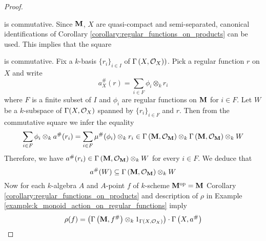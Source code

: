 \begin{proof}
\begin{center}
\begin{tikzpicture}
\end{tikzpicture}
\end{center}
is commutative. Since $\bd{M}$, $X$ are quasi-compact and semi-separated, canonical identifications of Corollary \ref{corollary:regular_functions_on_products} can be used. This implies that the square
\begin{center}
\end{center}
is commutative. Fix a $k$-basis $\{r_i\}_{i\in I}$ of $\Gamma\left(X,\cO_X)\right)$. Pick a regular function $r$ on $X$ and write
$$a^{\#}_X(r) = \sum_{i\in F}\phi_i\otimes_kr_i$$
where $F$ is a finite subset of $I$ and $\phi_i$ are regular functions on $\bd{M}$ for $i\in F$. Let $W$ be a $k$-subspace of $\Gamma(X,\cO_X)$ spanned by $\{r_i\}_{i\in F}$ and $r$. Then from the commutative square we infer the equality
$$\sum_{i\in F}\phi_i\otimes_ka^{\#}(r_i) = \sum_{i\in F}\mu^{\#}(\phi_i)\otimes_kr_i \in \Gamma\left(\bd{M},\cO_{\bd{M}}\right)\otimes_k \Gamma\left(\bd{M},\cO_{\bd{M}}\right) \otimes_k W$$
Therefore, we have $a^{\#}(r_i)\in \Gamma\left(\bd{M},\cO_{\bd{M}}\right)\otimes_kW$ for every $i\in F$. We deduce that
$$a^{\#}(W) \subseteq \Gamma\left(\bd{M},\cO_{\bd{M}}\right)\otimes_kW$$
Now for each $k$-algebra $A$ and $A$-point $f$ of $k$-scheme $\bd{M}^{\mathrm{op}} = \bd{M}$ Corollary \ref{corollary:regular_functions_on_products} and description of $\rho$ in Example \ref{example:k_monoid_action_on_regular_functions} imply
$$\rho(f) =  \big(\Gamma\left(\bd{M},f^{\#}\right)\otimes_k 1_{\Gamma(X,\cO_X)}\big)\cdot \Gamma\left(X,a^{\#}\right)$$

\end{proof}
